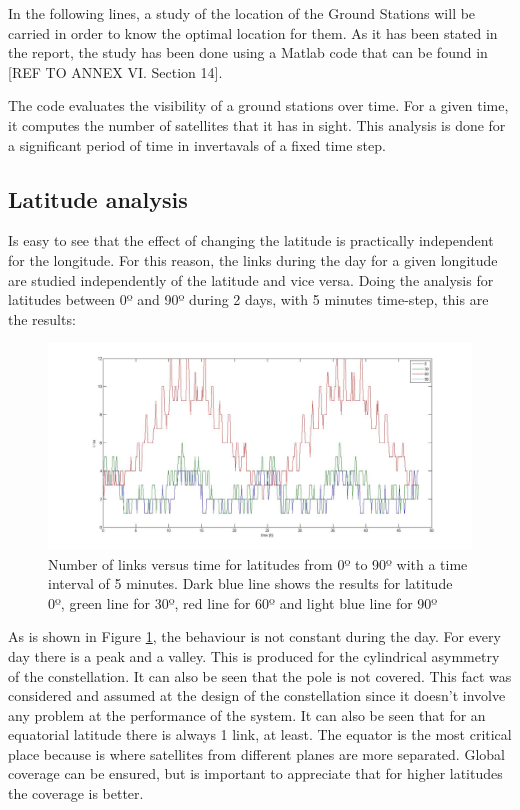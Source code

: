 In the following lines, a study of the location of the Ground Stations will be carried in order to know the optimal location for them. As it has been stated in the report, the study has been done using a Matlab code that can be found in [{REF TO ANNEX VI. Section 14}].

The code evaluates the visibility of a ground stations over time. For a given time, it computes the number of satellites that it has in sight. This analysis is done for a significant period of time in invertavals of a fixed time step.

\subsection{Latitude analysis}
Is easy to see that the effect of changing the latitude is practically independent for the longitude. For this reason, the links during the day for a given longitude are studied independently of the latitude and vice versa. Doing the analysis for latitudes between 0º and 90º during 2 days, with 5 minutes time-step, this are the results:
\begin{figure}[H]
\begin{center}
\includegraphics[scale=0.30]{0_30_90_lat.jpg}
\caption[Links vs time for latitudes from 0º to 90º]{Number of links versus time for latitudes from 0º to 90º with a time interval of 5 minutes. Dark blue line shows the results for latitude 0º, green line for 30º, red line for 60º and light blue line for 90º}
\label{fig:lat1}
\end{center}
\end{figure}
As is shown in Figure \ref{fig:lat1}, the behaviour is not constant during the day. For every day there is a peak and a valley. This is produced for the cylindrical asymmetry of the constellation. It can also be seen that the pole is not covered. This fact was considered and assumed at the design of the constellation since it doesn't involve any problem at the performance of the system. It can also be seen that for an equatorial latitude there is always 1 link, at least. The equator is the most critical place because is where satellites from different planes are more separated. Global coverage can be ensured, but is important to appreciate that for higher latitudes the coverage is better.

